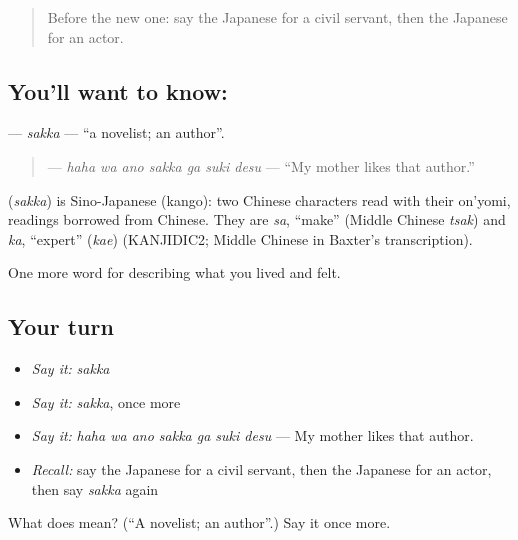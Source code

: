 \label{lesson:JA-C458-sakka}



\begin{quote}
Before the new one: say the Japanese for a civil servant, then the Japanese for an actor.
\end{quote}

\subsection*{You'll want to know: }
\textbf{} — \emph{sakka} — \textquotedblleft{}a novelist; an author\textquotedblright{}.

\begin{quote}
\textbf{   } — \emph{haha wa ano sakka ga suki desu} — \textquotedblleft{}My mother likes that author.\textquotedblright{}
\end{quote}

\begin{cousinweb}
\textbf{} (\emph{sakka}) is Sino-Japanese (kango): two Chinese characters read with their on'yomi, readings borrowed from Chinese. They are \emph{sa}, \textquotedblleft{}make\textquotedblright{} (Middle Chinese \emph{tsak}) and \emph{ka}, \textquotedblleft{}expert\textquotedblright{} (\emph{kae}) (KANJIDIC2; Middle Chinese in Baxter's transcription).
\end{cousinweb}

\begin{grammarlens}[title={What you've built}]
One more word for describing what you lived and felt.
\end{grammarlens}

\subsection*{Your turn}
\begin{itemize}
\raggedright
  \item \emph{Say it:} \emph{sakka}
  \item \emph{Say it:} \emph{sakka}, once more
  \item \emph{Say it:} \emph{haha wa ano sakka ga suki desu} — My mother likes that author.
  \item \emph{Recall:} say the Japanese for a civil servant, then the Japanese for an actor, then say \emph{sakka} again
\end{itemize}

\begin{tcolorbox}[breakable,colback=teal!4,colframe=teal!35!black,title={Before you move on}]
What does  mean? (\textquotedblleft{}A novelist; an author\textquotedblright{}.) Say it once more.
\end{tcolorbox}
